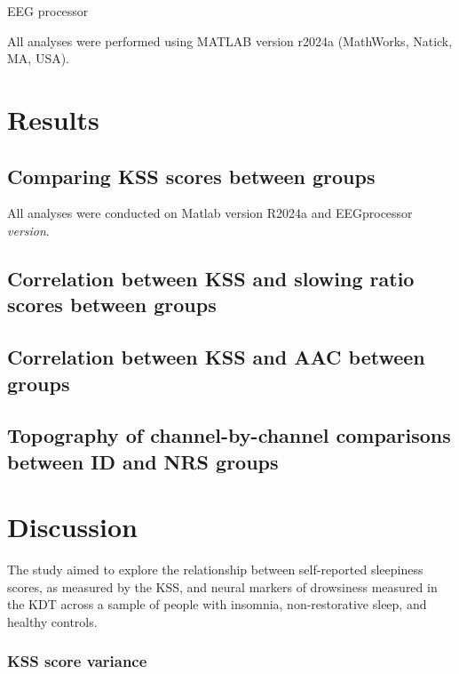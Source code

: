 \documentclass[
]{article}
\begin{document}
EEG processor

All analyses were performed using MATLAB version r2024a (MathWorks,
Natick, MA, USA).

\newpage

\section{Results}\label{sec:results}

\subsection{Comparing KSS scores between
groups}\label{comparing-kss-scores-between-groups}

All analyses were conducted on Matlab version R2024a and EEGprocessor
\emph{version}.

\subsection{Correlation between KSS and slowing ratio scores between
groups}\label{correlation-between-kss-and-slowing-ratio-scores-between-groups}

\subsection{Correlation between KSS and AAC between
groups}\label{correlation-between-kss-and-aac-between-groups}

\subsection{Topography of channel-by-channel comparisons between ID and
NRS
groups}\label{topography-of-channel-by-channel-comparisons-between-id-and-nrs-groups}

\newpage

\section{Discussion}\label{sec:discussion}

The study aimed to explore the relationship between self-reported
sleepiness scores, as measured by the KSS, and neural markers of
drowsiness measured in the KDT across a sample of people with insomnia,
non-restorative sleep, and healthy controls.

\subsubsection{KSS score variance}\label{kss-score-variance}
\end{document}
